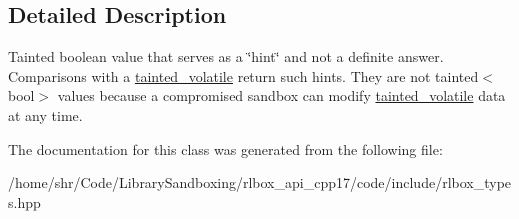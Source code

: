\subsection{Detailed Description}
Tainted boolean value that serves as a \char`\"{}hint\char`\"{} and not a definite answer. Comparisons with a \hyperlink{classrlbox_1_1tainted__volatile}{tainted\+\_\+volatile} return such hints. They are not {\ttfamily tainted$<$bool$>$} values because a compromised sandbox can modify \hyperlink{classrlbox_1_1tainted__volatile}{tainted\+\_\+volatile} data at any time. 

The documentation for this class was generated from the following file\+:\begin{DoxyCompactItemize}
\item 
/home/shr/\+Code/\+Library\+Sandboxing/rlbox\+\_\+api\+\_\+cpp17/code/include/rlbox\+\_\+types.\+hpp\end{DoxyCompactItemize}
